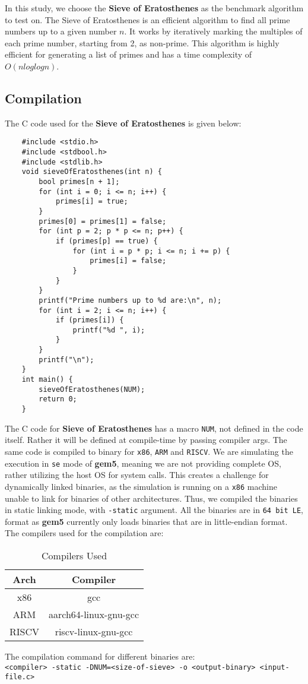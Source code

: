 In this study, we choose the \textbf{Sieve of Eratosthenes} as the benchmark
algorithm to test on. The Sieve of Eratosthenes is an efficient
algorithm to find all prime numbers up to a given number $n$. 
It works by iteratively marking the multiples of each prime number,
starting from 2, as non-prime. This algorithm is highly efficient
for generating a list of primes and has a time complexity of $O(nloglogn)$.

\subsection{Compilation}
The C code used for the \textbf{Sieve of Eratosthenes} is given below:
\begin{verbatim}
    #include <stdio.h>
    #include <stdbool.h>
    #include <stdlib.h>  
    void sieveOfEratosthenes(int n) {
        bool primes[n + 1];    
        for (int i = 0; i <= n; i++) {
            primes[i] = true;
        }
        primes[0] = primes[1] = false; 
        for (int p = 2; p * p <= n; p++) {
            if (primes[p] == true) {
                for (int i = p * p; i <= n; i += p) {
                    primes[i] = false;
                }
            }
        }
        printf("Prime numbers up to %d are:\n", n);
        for (int i = 2; i <= n; i++) {
            if (primes[i]) {
                printf("%d ", i);
            }
        }
        printf("\n");
    }
    int main() {
        sieveOfEratosthenes(NUM);
        return 0;
    }
\end{verbatim}
The C code for \textbf{Sieve of Eratosthenes} has a macro \texttt{NUM}, not defined in the code itself.
Rather it will be defined at compile-time by passing compiler args. The same code is compiled to binary for 
\texttt{x86}, \texttt{ARM} and \texttt{RISCV}. We are simulating the execution in \texttt{se} mode of 
\textbf{gem5}, meaning we are not providing complete OS, rather utilizing the host OS for system calls.
This creates a challenge for dynamically linked binaries, as the simulation is running on a \texttt{x86} machine
unable to link for binaries of other architectures. Thus, we compiled the binaries in static linking mode,
with \texttt{-static} argument. All the binaries are in \texttt{64 bit LE}, format as \textbf{gem5} currently
only loads binaries that are in little-endian format. The compilers used for the compilation are:

\begin{table}[ht]
\centering
\begin{tabular}{|c|c|}
\hline
Arch   & Compiler  \\ \hline
x86    & gcc                    \\ 
ARM    & aarch64-linux-gnu-gcc  \\ 
RISCV  & riscv-linux-gnu-gcc    \\ \hline
\end{tabular}
\caption{Compilers Used}
\end{table}
The compilation command for different binaries are:\\
\texttt{<compiler> -static -DNUM=<size-of-sieve> -o <output-binary> <input-file.c>}\\


